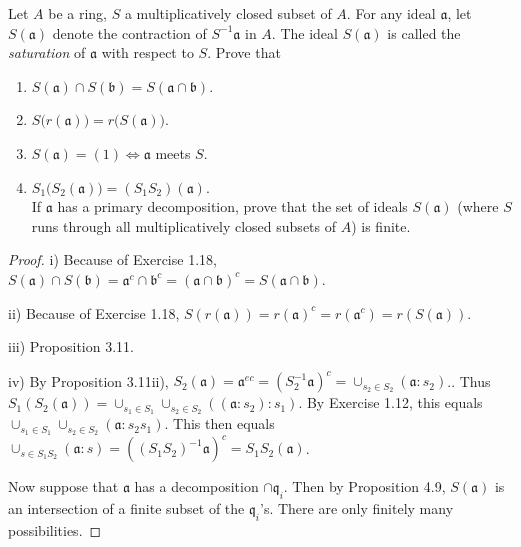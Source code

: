 \begin{exercise}
	Let $A$ be a ring, $S$ a multiplicatively closed subset of $A$. For any ideal $\mathfrak{a}$, let $S(\mathfrak{a})$ denote the contraction of $S^{-1}\mathfrak{a}$ in $A$. The ideal $S(\mathfrak{a})$ is called the \textit{saturation} of $\mathfrak{a}$ with respect to $S$. Prove that 
	\begin{enumerate}
		\item $S(\mathfrak{a}) \cap S(\mathfrak{b}) = S(\mathfrak{a} \cap \mathfrak{b})$. 
		\item $S\big(r(\mathfrak{a})\big) = r\big(S(\mathfrak{a})\big)$. 
		\item $S(\mathfrak{a}) = (1) \iff \mathfrak{a}$ meets $S$.
		\item $S_1\big(S_2(\mathfrak{a})\big) = (S_1 S_2)(\mathfrak{a})$. \\
			If $\mathfrak{a}$ has a primary decomposition, prove that the set of ideals $S(\mathfrak{a})$ (where $S$ runs through all multiplicatively closed subsets of $A$) is finite.
	\end{enumerate}
\end{exercise}
\begin{proof}
	i) Because of Exercise 1.18, $S(\mathfrak{a})\cap S(\mathfrak{b}) = \mathfrak{a}^c \cap \mathfrak{b}^c = (\mathfrak{a} \cap \mathfrak{b})^c = S(\mathfrak{a}\cap \mathfrak{b}) $.

	ii) Because of Exercise 1.18, $S(r(\mathfrak{a})) = r(\mathfrak{a})^c = r(\mathfrak{a}^c) = r(S(\mathfrak{a}))$.
	
	iii) Proposition 3.11.

	iv) By Proposition 3.11ii), $S_{2}(\mathfrak{a}) = \mathfrak{a}^{ec} = (S_{2}^{-1}\mathfrak{a})^c = \cup_{s_{2} \in S_{2}} (\mathfrak{a}:s_{2})$..
	Thus $S_{1}(S_{2}(\mathfrak{a})) = \cup_{s_{1}\in S_{1}} \cup_{s_{2}\in S_{2}}((\mathfrak{a}:s_{2}):s_{1})$.
	By Exercise 1.12, this equals $\cup_{s_{1}\in S_{1}} \cup_{s_{2}\in S_{2}}(\mathfrak{a}:s_{2}s_{1}) $.
	This then equals $\cup_{s\in S_{1} S_{2}}(\mathfrak{a}:s) = ((S_{1}S_{2})^{-1} \mathfrak{a})^c = S_{1}S_{2}(\mathfrak{a})$.

	Now suppose that $\mathfrak{a} $ has a decomposition $\cap \mathfrak{q}_i $.
	Then by Proposition 4.9, $S(\mathfrak{a}) $ is an intersection of a finite subset of the $\mathfrak{q}_i $'s.
	There are only finitely many possibilities.
\end{proof}

